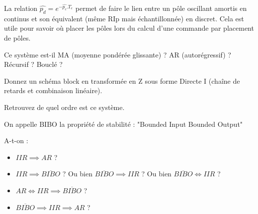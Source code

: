 \begin{remarque}
La relation $\widehat{p_d} = e^{-\widehat{p_c}.T_e}$ permet de faire le lien entre un
pôle oscillant amortis en continus et son équivalent (même RIp mais
échantillonnée) en discret. Cela est utile pour savoir où placer les
pôles lors du calcul d'une commande par placement de pôles.
\end{remarque}
Ce système est-il MA (moyenne pondérée glissante) ? AR (autorégressif) ? Récursif ? Bouclé ?


Donnez un schéma block en transformée en Z sous forme Directe I (chaîne de retards et combinaison linéaire). 

Retrouvez de quel ordre est ce système.

On appelle BIBO la propriété de stabilité : "Bounded Input Bounded Output"

A-t-on :  
\begin{itemize}
\item $IIR \implies AR$ ?
\item $IIR \implies \overline{BIBO}$ ? Ou bien $ \overline{BIBO} \implies IIR$ ? Ou bien $\overline{BIBO} \iff IIR$ ?
\item $AR \iff IIR \implies \overline{BIBO}$ ?
\item $\overline{BIBO} \implies IIR \implies AR$ ?
\end{itemize}
